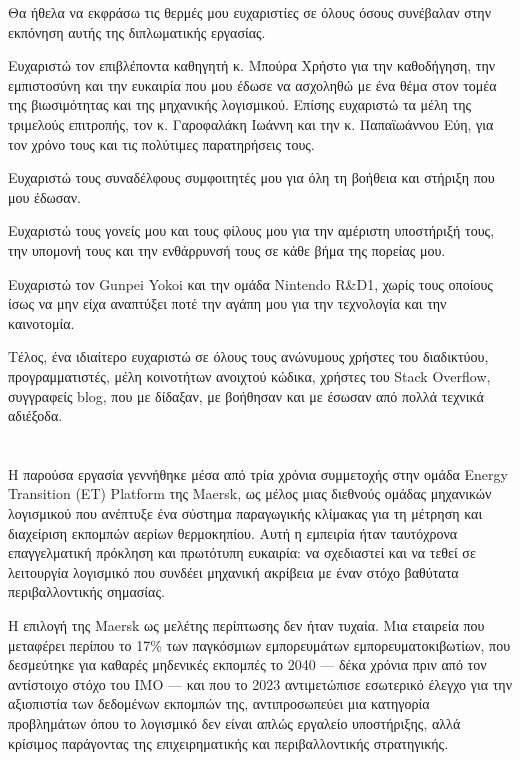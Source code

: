 \documentclass[11pt,a4paper,greek,twoside]{template-xe}
\begin{document}
\begin{acknowledgements}
Θα ήθελα να εκφράσω τις θερμές μου ευχαριστίες σε όλους όσους συνέβαλαν
στην εκπόνηση αυτής της διπλωματικής εργασίας.

Ευχαριστώ τον επιβλέποντα καθηγητή κ. Μπούρα Χρήστο για την καθοδήγηση,
την εμπιστοσύνη και την ευκαιρία που μου έδωσε να ασχοληθώ με ένα θέμα
στον τομέα της βιωσιμότητας και της μηχανικής λογισμικού. Επίσης
ευχαριστώ τα μέλη της τριμελούς επιτροπής, τον κ. Γαροφαλάκη Ιωάννη και
την κ. Παπαϊωάννου Εύη, για τον χρόνο τους και τις πολύτιμες
παρατηρήσεις τους.

Ευχαριστώ τους συναδέλφους συμφοιτητές μου για όλη τη βοήθεια και
στήριξη που μου έδωσαν.

Ευχαριστώ τους γονείς μου και τους φίλους μου για την αμέριστη
υποστήριξή τους, την υπομονή τους και την ενθάρρυνσή τους σε κάθε βήμα
της πορείας μου.

Ευχαριστώ τον Gunpei Yokoi και την ομάδα Nintendo R\&D1, χωρίς τους
οποίους ίσως να μην είχα αναπτύξει ποτέ την αγάπη μου για την τεχνολογία
και την καινοτομία.

Τέλος, ένα ιδιαίτερο ευχαριστώ σε όλους τους ανώνυμους χρήστες του
διαδικτύου, προγραμματιστές, μέλη κοινοτήτων ανοιχτού κώδικα, χρήστες
του Stack Overflow, συγγραφείς blog, που με δίδαξαν, με βοήθησαν και με
έσωσαν από πολλά τεχνικά αδιέξοδα.
\end{acknowledgements}

\chapter*{\prefacename}
Η παρούσα εργασία γεννήθηκε μέσα από τρία χρόνια συμμετοχής στην ομάδα
Energy Transition (ET) Platform της Maersk, ως μέλος μιας διεθνούς
ομάδας μηχανικών λογισμικού που ανέπτυξε ένα σύστημα παραγωγικής
κλίμακας για τη μέτρηση και διαχείριση εκπομπών αερίων θερμοκηπίου. Αυτή
η εμπειρία ήταν ταυτόχρονα επαγγελματική πρόκληση και πρωτότυπη
ευκαιρία: να σχεδιαστεί και να τεθεί σε λειτουργία λογισμικό που συνδέει
μηχανική ακρίβεια με έναν στόχο βαθύτατα περιβαλλοντικής σημασίας.

Η επιλογή της Maersk ως μελέτης περίπτωσης δεν ήταν τυχαία. Μια εταιρεία
που μεταφέρει περίπου το 17\% των παγκόσμιων εμπορευμάτων
εμπορευματοκιβωτίων, που δεσμεύτηκε για καθαρές μηδενικές εκπομπές το
2040 --- δέκα χρόνια πριν από τον αντίστοιχο στόχο του ΙΜΟ --- και που
το 2023 αντιμετώπισε εσωτερικό έλεγχο για την αξιοπιστία των δεδομένων
εκπομπών της, αντιπροσωπεύει μια κατηγορία προβλημάτων όπου το λογισμικό
δεν είναι απλώς εργαλείο υποστήριξης, αλλά κρίσιμος παράγοντας της
επιχειρηματικής και περιβαλλοντικής στρατηγικής.
\end{document}
